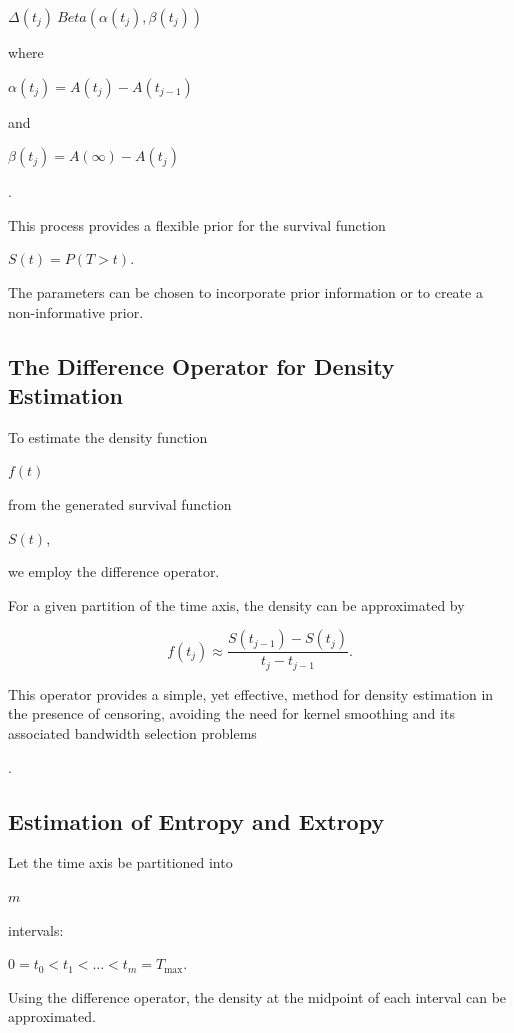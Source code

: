 \documentclass[10pt,twoside]{article}
\numberwithin{equation}{section}
\begin{document}
$\Delta(t_j) ~ Beta( \alpha(t_j) , \beta(t_j) )$

where 

$\alpha(t_j) = A(t_j) - A(t_{j-1})$ 

and 

$\beta(t_j) = A(\infty) - A(t_j)$

\citep{12}. 


This process provides a flexible prior for the survival function 

$S(t) = P(T > t)$. 

The parameters can be chosen to incorporate prior information or to create a non-informative prior. 



\subsection{The Difference Operator for Density Estimation}

To estimate the density function 

$f(t)$ 

from the generated survival function 

$S(t)$, 

we employ the difference operator. 

For a given partition of the time axis, the density can be approximated by

\begin{equation*}

f(t_j) \approx \frac{S(t_{j-1}) - S(t_j)}{t_j - t_{j-1}}.

\end{equation*}

This operator provides a simple, yet effective, method for density estimation in the presence of censoring, avoiding the need for kernel smoothing and its associated bandwidth selection problems

\citep{11}. 

\subsection{Estimation of Entropy and Extropy}

Let the time axis be partitioned into

$m$ 

intervals: 

$0 = t_0 < t_1 < \ldots < t_m = T_{\mathrm{max}}$. 

Using the difference operator, the density at the midpoint of each interval can be approximated. 
\end{document}
